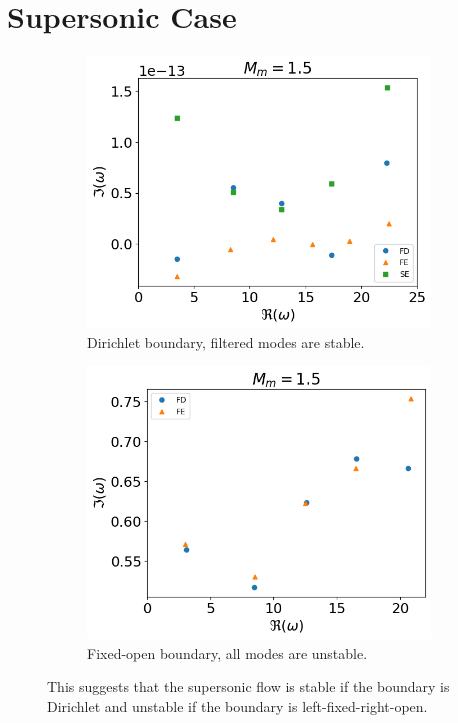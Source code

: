 \section{Supersonic Case}
\begin{figure} [H]
  \centering
  \begin{subfigure}{0.45\textwidth}
    \centering
    \includegraphics[width=\linewidth]{../../thesis/img/numerical-experiments/fixed-fixed/supersonic-v}
    \caption{Dirichlet boundary, filtered modes are stable.}
  \end{subfigure}%
  \begin{subfigure}{0.45\textwidth}
    \centering
    \includegraphics[width=\linewidth]{../../thesis/img/numerical-experiments/fixed-open/supersonic-v}
    \caption{Fixed-open boundary, all modes are unstable.}
  \end{subfigure}
  \caption{This suggests that the supersonic flow is stable if the boundary is Dirichlet and unstable if the boundary is left-fixed-right-open.}
\end{figure}


